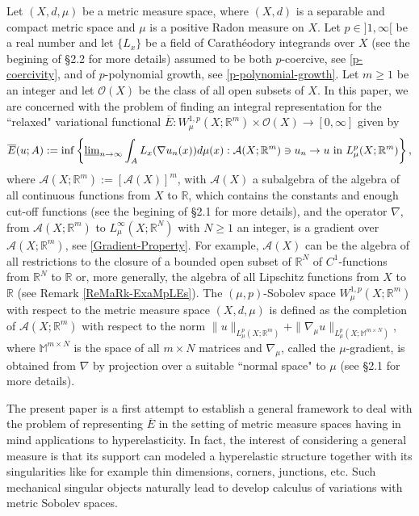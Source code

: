 \documentclass[10pt]{amsart}
\numberwithin{equation}{section}
\theoremstyle{definition}
\theoremstyle{remark}
\begin{document}
Let $(X,d,\mu)$ be a metric measure space, where $(X,d)$ is a separable and compact metric space and $\mu$ is a positive Radon measure on $X$. Let $p\in]1,\infty[$ be a real number and let $\{L_x\}$ be a field of Carath\'eodory integrands over $X$ (see the begining of \S 2.2 for more details) assumed to be both $p$-coercive, see \eqref{p-coercivity}, and of $p$-polynomial growth, see \eqref{p-polynomial-growth}. Let $m\geq 1$ be an integer and let $\mathcal{O}(X)$ be the class of all open subsets of $X$. In this paper, we are concerned with the problem of finding an integral representation for the ``relaxed" variational functional $\overline{E}:W^{1,p}_\mu(X;{{\mathbb R}}^m)\times\mathcal{O}(X)\to[0,\infty]$ given by
$$
\overline{E}(u;A):=\inf\left\{{\mathop{\underline{\lim}}}_{n\to\infty}\int_A L_x(\nabla u_n(x))d\mu(x):\mathcal{A}(X;{{\mathbb R}}^m)\ni u_n\to u\hbox{ in }L^p_\mu(X;{{\mathbb R}}^m)\right\},
$$
where $\mathcal{A}(X;{{\mathbb R}}^m):=[\mathcal{A}(X)]^m$, with $\mathcal{A}(X)$ a subalgebra of the algebra of all continuous functions from $X$ to ${{\mathbb R}}$, which contains the constants and enough cut-off functions (see the begining of \S 2.1 for more details), and the operator $\nabla$, from $\mathcal{A}(X;{{\mathbb R}}^m)$ to $L^\infty_\mu(X;{{\mathbb R}}^N)$ with $N\geq 1$ an integer, is a gradient over $\mathcal{A}(X;{{\mathbb R}}^m)$, see \eqref{Gradient-Property}. For example, $\mathcal{A}(X)$ can be the algebra of all restrictions to the closure of a bounded open subset of ${{\mathbb R}}^N$ of $C^1$-functions from ${{\mathbb R}}^N$ to ${{\mathbb R}}$ or, more generally, the algebra of all Lipschitz functions from $X$ to ${{\mathbb R}}$ (see Remark \ref{ReMaRk-ExaMpLEs}). The $(\mu,p)$-Sobolev space $W^{1,p}_\mu(X;{{\mathbb R}}^m)$ with respect to the metric measure space $(X,d,\mu)$ is defined as the completion of $\mathcal{A}(X;{{\mathbb R}}^m)$ with respect to the norm $\|u\|_{L^p_\mu(X;{{\mathbb R}}^m)}+\|\nabla_\mu u\|_{L^p_\mu(X;{{\mathbb M}^{m\times N}})}$, where ${{\mathbb M}^{m\times N}}$ is the space of all $m\times N$ matrices and $\nabla_\mu$, called the $\mu$-gradient, is obtained from $\nabla$ by projection over a suitable ``normal space" to $\mu$ (see \S 2.1 for more details). 

The present paper is a first attempt to establish a general framework to deal with the problem of representing $\overline{E}$ in the setting of metric measure spaces having in mind applications to hyperelasticity. In fact, the interest of considering a general measure is that its support can modeled a hyperelastic structure together with its singularities like for example thin dimensions, corners, junctions, etc.   Such mechanical singular objects naturally lead to develop calculus of variations with metric Sobolev spaces. 
\end{document}
